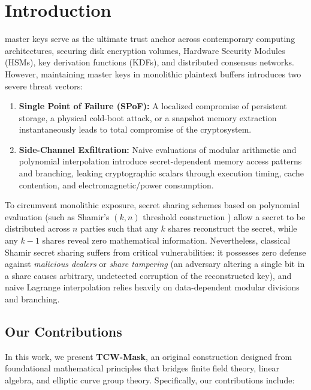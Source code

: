 \documentclass[10pt,journal,compsoc]{IEEEtran}
\begin{document}
\maketitle
\IEEEdisplaynontitleabstractindextext
\IEEEpeerreviewmaketitle

\section{Introduction}
 master keys serve as the ultimate trust anchor across contemporary computing architectures, securing disk encryption volumes, Hardware Security Modules (HSMs), key derivation functions (KDFs), and distributed consensus networks. However, maintaining master keys in monolithic plaintext buffers introduces two severe threat vectors:

\begin{enumerate}
    \item \textbf{Single Point of Failure (SPoF):} A localized compromise of persistent storage, a physical cold-boot attack, or a snapshot memory extraction instantaneously leads to total compromise of the cryptosystem.
    \item \textbf{Side-Channel Exfiltration:} Naive evaluations of modular arithmetic and polynomial interpolation introduce secret-dependent memory access patterns and branching, leaking cryptographic scalars through execution timing, cache contention, and electromagnetic/power consumption.
\end{enumerate}

To circumvent monolithic exposure, secret sharing schemes based on polynomial evaluation (such as Shamir's $(k, n)$ threshold construction \cite{shamir1979share}) allow a secret to be distributed across $n$ parties such that any $k$ shares reconstruct the secret, while any $k-1$ shares reveal zero mathematical information. Nevertheless, classical Shamir secret sharing suffers from critical vulnerabilities: it possesses zero defense against \textit{malicious dealers} or \textit{share tampering} (an adversary altering a single bit in a share causes arbitrary, undetected corruption of the reconstructed key), and naive Lagrange interpolation relies heavily on data-dependent modular divisions and branching.

\subsection{Our Contributions}
In this work, we present \textbf{TCW-Mask}, an original construction designed from foundational mathematical principles that bridges finite field theory, linear algebra, and elliptic curve group theory. Specifically, our contributions include:
\end{document}
